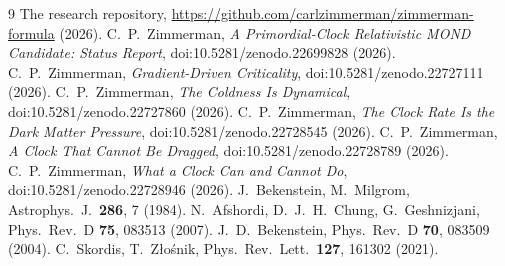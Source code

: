 \documentclass[11pt,letterpaper]{article}
\begin{document}
\begin{thebibliography}{9}
 The research repository, \url{https://github.com/carlzimmerman/zimmerman-formula} (2026).
 C.~P.~Zimmerman, \emph{A Primordial-Clock Relativistic MOND Candidate: Status Report}, doi:10.5281/zenodo.22699828 (2026).
 C.~P.~Zimmerman, \emph{Gradient-Driven Criticality}, doi:10.5281/zenodo.22727111 (2026).
 C.~P.~Zimmerman, \emph{The Coldness Is Dynamical}, doi:10.5281/zenodo.22727860 (2026).
 C.~P.~Zimmerman, \emph{The Clock Rate Is the Dark Matter Pressure}, doi:10.5281/zenodo.22728545 (2026).
 C.~P.~Zimmerman, \emph{A Clock That Cannot Be Dragged}, doi:10.5281/zenodo.22728789 (2026).
 C.~P.~Zimmerman, \emph{What a Clock Can and Cannot Do}, doi:10.5281/zenodo.22728946 (2026).
 J.~Bekenstein, M.~Milgrom, Astrophys.\ J.\ \textbf{286}, 7 (1984).
 N.~Afshordi, D.~J.~H.~Chung, G.~Geshnizjani, Phys.\ Rev.\ D \textbf{75}, 083513 (2007).
 J.~D.~Bekenstein, Phys.\ Rev.\ D \textbf{70}, 083509 (2004).
 C.~Skordis, T.~Z\l{}o\'snik, Phys.\ Rev.\ Lett.\ \textbf{127}, 161302 (2021).
\end{thebibliography}
\end{document}

